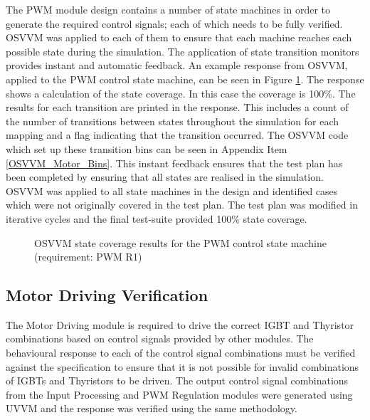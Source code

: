 The PWM module design contains a number of state machines in order to generate the required control signals; each of which needs to be fully verified. OSVVM was applied to each of them to ensure that each machine reaches each possible state during the simulation. The application of state transition monitors provides instant and automatic feedback. An example response from OSVVM, applied to the PWM control state machine, can be seen in Figure \ref{osvvm_results}. The response shows a calculation of the state coverage. In this case the coverage is 100\%. The results for each transition are printed in the response. This includes a count of the number of transitions between states throughout the simulation for each mapping and a flag indicating that the transition occurred. The OSVVM code which set up these transition bins can be seen in Appendix Item \ref{OSVVM_Motor_Bins}. This instant feedback ensures that the test plan has been completed by ensuring that all states are realised in the simulation. OSVVM was applied to all state machines in the design and identified cases which were not originally covered in the test plan. The test plan was modified in iterative cycles and the final test-suite provided 100\% state coverage.

\begin{figure}[h]
\centering
{}
\caption{OSVVM state coverage results for the PWM control state machine (requirement: PWM R1)}
\label{osvvm_results}
\end{figure}

\subsection{Motor Driving Verification}

The Motor Driving module is required to drive the correct IGBT and Thyristor combinations based on control signals provided by other modules. The behavioural response to each of the control signal combinations must be verified against the specification to ensure that it is not possible for invalid combinations of IGBTs and Thyristors to be driven. The output control signal combinations from the Input Processing and PWM Regulation modules were generated using UVVM and the response was verified using the same methodology.


